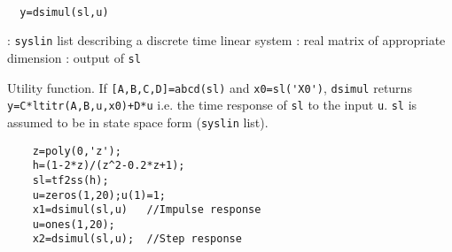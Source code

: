 \begin{mandesc}
   \\ %
\end{mandesc}
\begin{calling_sequence}
\begin{verbatim}
  y=dsimul(sl,u)  
\end{verbatim}
\end{calling_sequence}
\begin{parameters}
  \begin{varlist}
    : \verb!syslin! list describing a discrete time linear system
    : real matrix of appropriate dimension
    : output of \verb!sl!
  \end{varlist}
\end{parameters}
\begin{mandescription}
  Utility function.  If \verb![A,B,C,D]=abcd(sl)! and \verb!x0=sl('X0')!,
  \verb!dsimul! returns \verb!y=C*ltitr(A,B,u,x0)+D*u! i.e.  the time response
  of \verb!sl! to the input \verb!u!.  \verb!sl! is assumed to be in state space
  form (\verb!syslin! list).
\end{mandescription}
\begin{examples}
  \begin{Verbatim}
    z=poly(0,'z');
    h=(1-2*z)/(z^2-0.2*z+1);
    sl=tf2ss(h);
    u=zeros(1,20);u(1)=1;
    x1=dsimul(sl,u)   //Impulse response
    u=ones(1,20);
    x2=dsimul(sl,u);  //Step response
  \end{Verbatim}
\end{examples}
\begin{manseealso}
      
\end{manseealso}

